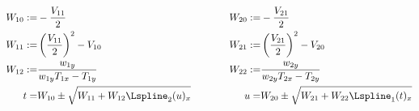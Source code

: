 $$\begin{aligned}
	W_{10} :=& -\frac{V_{11}}{2} & \hspace{1cm}
	W_{20} :=& -\frac{V_{21}}{2} \\
	W_{11} :=& \left(\frac{V_{11}}{2}\right)^2 - V_{10} & \hspace{1cm}
	W_{21} :=& \left(\frac{V_{21}}{2}\right)^2 - V_{20} \\
	W_{12} :=& \frac{w_{1y}}{ w_{1y}T_{1x}-T_{1y} } & \hspace{1cm}
	W_{22} :=& \frac{w_{2y}}{ w_{2y}T_{2x}-T_{2y} } \\
	t =& W_{10} \pm \sqrt{
		W_{11} + W_{12}\Lspline_2(u)_x
	} & \hspace{1cm}
	u =& W_{20} \pm \sqrt{
		W_{21} + W_{22}\Lspline_1(t)_x
	} \\

\end{aligned}$$

